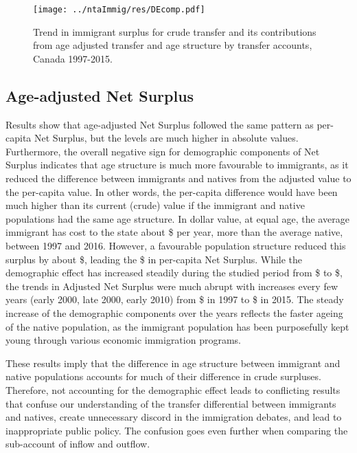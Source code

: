 \begin{figure}[H]%
  \caption{Trend in immigrant surplus for crude transfer and its contributions from age adjusted transfer and age structure by transfer accounts, Canada 1997-2015.}
  \texttt{[image: ../ntaImmig/res/DEcomp.pdf]}%
  \label{fig:DEcomp}%
\end{figure}%

\subsection{Age-adjusted Net Surplus}

Results show that age-adjusted Net Surplus followed the same pattern as per-capita Net Surplus, but the levels are much higher in absolute values.
Furthermore, the overall negative sign for demographic components of Net Surplus indicates that age structure is much more favourable to immigrants, as it reduced the difference between immigrants and natives from the adjusted value to the per-capita value.
In other words, the per-capita difference would have been much higher than its current (crude) value if the immigrant and native populations had the same age structure.
In dollar value, at equal age, the average immigrant has cost to the state about \$ per year, more than the average native, between 1997 and 2016.
However, a favourable population structure reduced this surplus by about \$, leading the \$ in per-capita Net Surplus.
While the demographic effect has increased steadily during the studied period from \$ to \$, the trends in Adjusted Net Surplus were much abrupt with increases every few years (early 2000, late 2000, early 2010) from \$ in 1997 to \$ in 2015.
The steady increase of the demographic components over the years reflects the faster ageing of the native population, as the immigrant population has been purposefully kept young through various economic immigration programs.

\vspace{0.7em}\par
These results imply that the difference in age structure between immigrant and native populations accounts for much of their difference in crude surpluses.
Therefore, not accounting for the demographic effect leads to conflicting results that confuse our understanding of the transfer differential between immigrants and natives, create unnecessary discord in the immigration debates, and lead to inappropriate public policy.
The confusion goes even further when comparing the sub-account of inflow and outflow.

